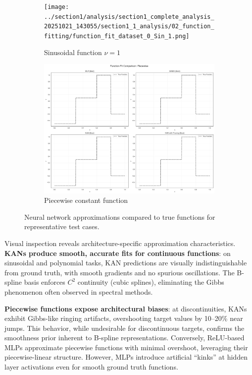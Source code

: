 \documentclass[11pt,a4paper]{article}
\begin{document}
\begin{figure}[htbp]
\centering
\begin{subfigure}{0.48\textwidth}
\texttt{[image: ../section1/analysis/section1\_complete\_analysis\_20251021\_143055/section1\_1\_analysis/02\_function\_fitting/function\_fit\_dataset\_0\_Sin\_1.png]}
\caption{Sinusoidal function $\nu=1$}
\end{subfigure}
\hfill
\begin{subfigure}{0.48\textwidth}
\includegraphics[width=\textwidth]{../section1/analysis/section1_complete_analysis_20251021_143055/section1_1_analysis/02_function_fitting/function_fit_dataset_5_Piecewise.png}
\caption{Piecewise constant function}
\end{subfigure}
\caption{Neural network approximations compared to true functions for representative test cases.}
\label{fig:s11_fits}
\end{figure}

Visual inspection reveals architecture-specific approximation characteristics. \textbf{KANs produce smooth, accurate fits for continuous functions}: on sinusoidal and polynomial tasks, KAN predictions are visually indistinguishable from ground truth, with smooth gradients and no spurious oscillations. The B-spline basis enforces $C^2$ continuity (cubic splines), eliminating the Gibbs phenomenon often observed in spectral methods.

\textbf{Piecewise functions expose architectural biases}: at discontinuities, KANs exhibit Gibbs-like ringing artifacts, overshooting target values by 10--20\% near jumps. This behavior, while undesirable for discontinuous targets, confirms the smoothness prior inherent to B-spline representations. Conversely, ReLU-based MLPs approximate piecewise functions with minimal overshoot, leveraging their piecewise-linear structure. However, MLPs introduce artificial ``kinks'' at hidden layer activations even for smooth ground truth functions.
\end{document}
